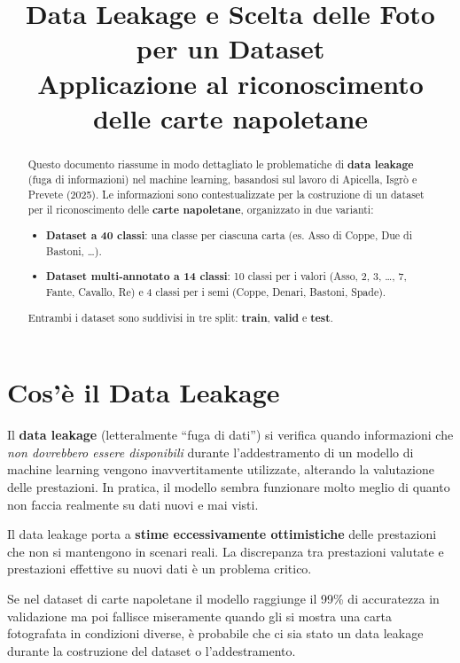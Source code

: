 \documentclass[a4paper,12pt]{article}
\title{\textbf{Data Leakage e Scelta delle Foto per un Dataset}\\[0.5em]
\large Applicazione al riconoscimento delle carte napoletane}
\author{}
\date{}
\begin{document}
\maketitle

\begin{abstract}
Questo documento riassume in modo dettagliato le problematiche di \textbf{data leakage} (fuga di informazioni) nel machine learning, basandosi sul lavoro di Apicella, Isgrò e Prevete (2025). Le informazioni sono contestualizzate per la costruzione di un dataset per il riconoscimento delle \textbf{carte napoletane}, organizzato in due varianti:
\begin{itemize}[noitemsep]
    \item \textbf{Dataset a 40 classi}: una classe per ciascuna carta (es. Asso di Coppe, Due di Bastoni, \ldots).
    \item \textbf{Dataset multi-annotato a 14 classi}: 10 classi per i valori (Asso, 2, 3, \ldots, 7, Fante, Cavallo, Re) e 4 classi per i semi (Coppe, Denari, Bastoni, Spade).
\end{itemize}
Entrambi i dataset sono suddivisi in tre split: \textbf{train}, \textbf{valid} e \textbf{test}.
\end{abstract}

\tableofcontents
\newpage

\section{Cos'è il Data Leakage}

Il \textbf{data leakage} (letteralmente ``fuga di dati'') si verifica quando informazioni che \emph{non dovrebbero essere disponibili} durante l'addestramento di un modello di machine learning vengono inavvertitamente utilizzate, alterando la valutazione delle prestazioni. In pratica, il modello sembra funzionare molto meglio di quanto non faccia realmente su dati nuovi e mai visti.

Il data leakage porta a \textbf{stime eccessivamente ottimistiche} delle prestazioni che non si mantengono in scenari reali. La discrepanza tra prestazioni valutate e prestazioni effettive su nuovi dati è un problema critico.

\begin{esempio}
Se nel dataset di carte napoletane il modello raggiunge il 99\% di accuratezza in validazione ma poi fallisce miseramente quando gli si mostra una carta fotografata in condizioni diverse, è probabile che ci sia stato un data leakage durante la costruzione del dataset o l'addestramento.
\end{esempio}
\end{document}
